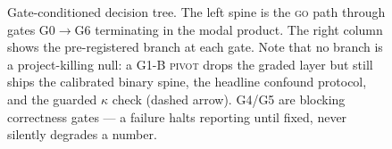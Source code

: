 \begin{figure}[t]
\caption[Gate-conditioned decision tree]{Gate-conditioned decision tree. The left
spine is the \textsc{go} path through gates G0$\to$G6 terminating in the modal
product. The right column shows the pre-registered branch at each gate. Note that
no branch is a project-killing null: a G1-B \textsc{pivot} drops the graded layer
but still ships the calibrated binary spine, the headline confound protocol, and
the guarded $\kappa$ check (dashed arrow). G4/G5 are blocking correctness gates --- a
failure halts reporting until fixed, never silently degrades a number.}
\label{fig:gate-tree}
\end{figure}


